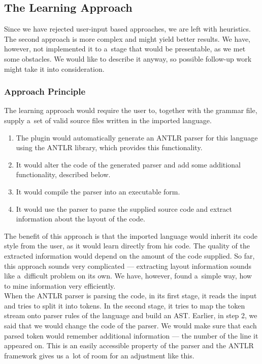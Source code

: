 \subsection{The Learning Approach}
\label{chap:learning_approach}

Since we have rejected user-input based approaches, we are left with heuristics.
The second approach is more complex and might yield better results.
We have, however, not implemented it to a~stage that would be presentable, as we met some obstacles.
We would like to describe it anyway, so possible follow-up work might take it into consideration.
\\

\subsubsection{Approach Principle}

The learning approach would require the user to, together with the grammar file, supply a~set of valid source files written in the imported language.

\begin{enumerate}
	\item The plugin would automatically generate an ANTLR parser for this language using the ANTLR library, which provides this functionality.

	\item It would alter the code of the generated parser and add some additional functionality, described below.

	\item It would compile the parser into an executable form.

	\item It would use the parser to parse the supplied source code and extract information about the layout of the code.
\end{enumerate}

The benefit of this approach is that the imported language would inherit its code style from the user, as it would learn directly from his code.
The quality of the extracted information would depend on the amount of the code supplied.
So far, this approach sounds very complicated --- extracting layout information sounds like a~difficult problem on its own.
We have, however, found a~simple way, how to mine information very efficiently.
\\

When the ANTLR parser is parsing the code, in its first stage, it reads the input and tries to split it into tokens.
In the second stage, it tries to map the token stream onto parser rules of the language and build an AST.
Earlier, in step 2, we said that we would change the code of the parser.
We would make sure that each parsed token would remember additional information --- the number of the line it appeared on.
This is an easily accessible property of the parser and the ANTLR framework gives us a~lot of room for an adjustment like this.
\\


